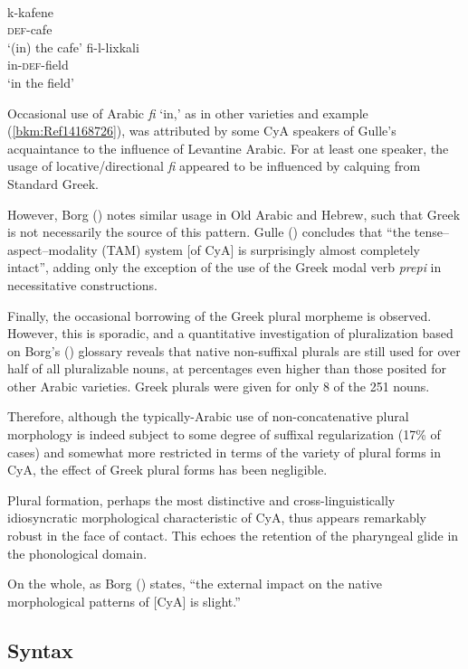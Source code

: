 \documentclass[output=paper]{langsci/langscibook}
\begin{document}
\ea
{}\\
\ea \gll k-kafene\\
     \textsc{def}-cafe  \\
\glt ‘(in) the cafe’
\ex \gll fi-l-lixkali\\
     in-\textsc{def}-field\\
\glt ‘in the field’\label{bkm:Ref14168726} \label{field}
\z
\z

Occasional use of Arabic \textit{fi} ‘in,’ as in other varieties and example (\ref{bkm:Ref14168726}), was attributed by some CyA speakers of Gulle’s acquaintance to the influence of Levantine Arabic. For at least one speaker, the usage of locative/directional \textit{fi} appeared to be influenced by calquing from Standard Greek. 

However, Borg (\citeyear[3]{Borg2004}) notes similar usage in Old Arabic and Hebrew, such that Greek is not necessarily the source of this pattern. Gulle (\citeyear[47]{Gulle2016}) concludes that “the tense--aspect--modality (TAM) system [of CyA] is surprisingly almost completely intact”, adding only the exception of the use of the Greek modal verb \textit{prepi} in necessitative constructions. 

Finally, the occasional borrowing of the Greek plural morpheme is observed. However, this is sporadic, and a quantitative investigation of pluralization based on Borg's (\citeyear{Borg2004}) glossary \citep{Walter2017} reveals that native non-suffixal plurals are still used for over half of all pluralizable nouns, at percentages even higher than those posited for other Arabic varieties. Greek plurals were given for only 8 of the 251 nouns. 

Therefore, although the typically-Arabic use of non-concatenative plural morphology is indeed subject to some degree of suffixal regularization (17\% of cases) and somewhat more restricted in terms of the variety of plural forms in CyA, the effect of Greek plural forms has been negligible. 

Plural formation, perhaps the most distinctive and cross-linguistically idiosyncratic morphological characteristic of CyA, thus appears remarkably robust in the face of contact. This echoes the retention of the pharyngeal glide in the phonological domain. 

On the whole, as Borg (\citeyear[57]{Borg1994}) states, “the external impact on the native morphological patterns of [CyA] is slight.” 

\subsection{Syntax}
\end{document}
